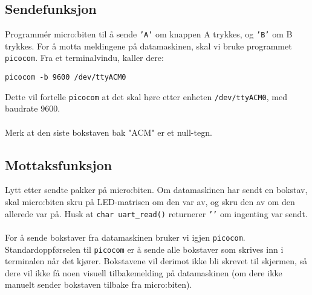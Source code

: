 \documentclass[11pt,a4paper]{article}
\begin{document}
\subsection{Sendefunksjon}
Programmér micro:biten til å sende \texttt{'A'} om knappen A trykkes, og \texttt{'B'} om B trykkes. For å motta meldingene på datamaskinen, skal vi bruke programmet \texttt{picocom}. Fra et terminalvindu, kaller dere:
\begin{verbatim}
picocom -b 9600 /dev/ttyACM0
\end{verbatim}
Dette vil fortelle \texttt{picocom} at det skal høre etter enheten \texttt{/dev/ttyACM0}, med baudrate 9600.\\
\\
Merk at den siste bokstaven bak "ACM" er et null-tegn.

\subsection{Mottaksfunksjon}
Lytt etter sendte pakker på micro:biten. Om datamaskinen har sendt en bokstav, skal micro:biten skru på LED-matrisen om den var av, og skru den av om den allerede var på. Husk at \texttt{char uart_read()} returnerer \texttt{'\0'} om ingenting var sendt.\\
\\
For å sende bokstaver fra datamaskinen bruker vi igjen \texttt{picocom}. Standardoppførselen til \texttt{picocom} er å sende alle bokstaver som skrives inn i terminalen når det kjører. Bokstavene vil derimot ikke bli skrevet til skjermen, så dere vil ikke få noen visuell tilbakemelding på datamaskinen (om dere ikke manuelt sender bokstaven tilbake fra micro:biten).
\end{document}
